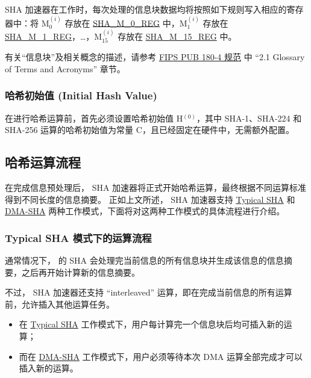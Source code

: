 \documentclass[main\_\_CN.tex]{subfiles}
\begin{document}
SHA 加速器在工作时，每次处理的信息块数据均将按照如下规则写入相应的寄存器中：将 M$^{(i)}_{0}$ 存放在 \hyperref[regdesc:SHAMNREG]{SHA\_M\_0\_REG} 中，M$^{(i)}_1$ 存放在 \hyperref[regdesc:SHAMNREG]{SHA\_M\_1\_REG}，\dots，M$^{(i)}_{15}$ 存放在 \hyperref[regdesc:SHAMNREG]{SHA\_M\_15\_REG} 中。

\begin{tiplisting}
有关“信息块”及相关概念的描述，请参考 \href{https://doi.org/10.6028/NIST.FIPS.180-4}{FIPS PUB 180-4 规范} 中 “2.1 Glossary of Terms and Acronyms” 章节。
\end{tiplisting}

\subsubsection{哈希初始值 (Initial Hash Value)}\label{sec:sha-set-initial-hash}
在进行哈希运算前，首先必须设置哈希初始值 H$^{(0)}$，其中 SHA-1、SHA-224 和 SHA-256 运算的哈希初始值为常量 C，且已经固定在硬件中，无需额外配置。

\subsection{哈希运算流程}\label{sec:sha-hash-operation}

在完成信息预处理后，\chipname{} SHA 加速器将正式开始哈希运算，最终根据不同运算标准得到不同长度的信息摘要。
正如上文所述，\chipname{} SHA 加速器支持 \hyperref[sec:sha-typical-sha]{Typical SHA} 和 \hyperref[sec:sha-dma-sha]{DMA-SHA} 两种工作模式，下面将对这两种工作模式的具体流程进行介绍。

\subsubsection{Typical SHA 模式下的运算流程}\label{sec:sha-typical-sha}

通常情况下，\chipname{} 的 SHA 会处理完当前信息的所有信息块并生成该信息的信息摘要，之后再开始计算新的信息摘要。

不过，\chipname{} SHA 加速器还支持 “interleaved” 运算，即在完成当前信息的所有运算前，允许插入其他运算任务。
\begin{itemize}
    \item 在 \hyperref[sec:sha-typical-sha]{Typical SHA} 工作模式下，用户每计算完一个信息块后均可插入新的运算；
    \item 而在 \hyperref[sec:sha-dma-sha]{DMA-SHA} 工作模式下，用户必须等待本次 DMA 运算全部完成才可以插入新的运算。
\end{itemize}
\end{document}
